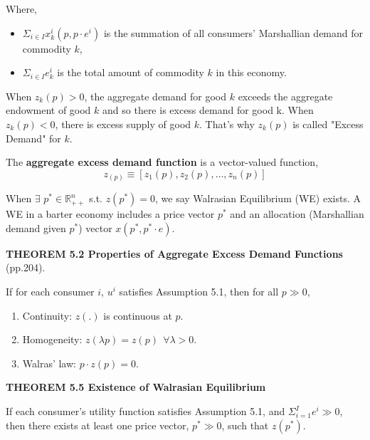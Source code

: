 \documentclass{article}
\newcommand{\R}{\mathbb{R}}
\begin{document}
\begin{mdframed}[backgroundcolor=blue!20,linecolor=white]
Where,
\begin{itemize}
\item $\Sigma_{i \in I } x^i_k(p,p\cdot e^i)$ is the summation of all consumers' Marshallian demand for commodity $k$,
\item $\Sigma_{i \in I } e^i_k$ is the total amount of commodity $k$ in this economy.
\end{itemize}

When $z_k(p) > 0$, the aggregate demand for good $k$ exceeds the aggregate endowment of good $k$ and so there is excess demand for good k. When $z_k(p) < 0$, there is excess supply of good $k$. That's why $z_k(p)$ is called "Excess Demand" for $k$.
\vspace{2mm}

The \textbf{aggregate excess demand function} is a vector-valued function,
$$z_(p) \equiv [z_1(p),z_2(p),\dots,z_n(p)]$$

\vspace{2mm}


When $\exists$ $p^* \in \R^n_{++}$ s.t. $z(p^*) = 0$, we say
Walrasian Equilibrium (WE) exists. A WE in a barter economy includes a price vector $p^*$ and an allocation (Marshallian demand given $p^*$) vector $x(p^*,p^*\cdot e)$.

\vspace{4mm}

\textbf{THEOREM 5.2 Properties of Aggregate Excess Demand Functions} (pp.204).

If for each consumer $i$, $u^i$ satisfies Assumption 5.1, then for all $p \gg 0$,


\begin{enumerate}
\item Continuity: $z(.)$ is continuous at $p$.
\item Homogeneity: $z(\lambda p) = z(p) \ \ \forall \lambda > 0$.
\item Walras' law: $p \cdot z(p) = 0$.
\end{enumerate}

\vspace{4mm}

\textbf{THEOREM 5.5 Existence of Walrasian Equilibrium}

If each consumer's utility function satisfies Assumption 5.1, and
$\Sigma_{i=1}^{I} e^i \gg 0$, then there exists at least one price vector, $p^* \gg 0$, such that $z(p^*)$.


\end{mdframed}


\vspace{2mm}
\end{document}

